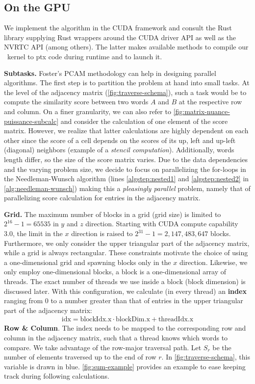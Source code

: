 \subsection{On the GPU}

We implement the algorithm in the CUDA framework and consult the  Rust library supplying Rust wrappers around the CUDA driver API as well as the NVRTC API (among others). The latter makes available methods to compile our \Cpp~kernel to \gls{ptx} code during runtime and to launch it.

\textbf{Subtasks.} Foster's PCAM methodology \cite{foster} can help in designing parallel algorithms. The first step is to partition the problem at hand into small tasks. At the level of the adjacency matrix (\autoref{fig:traverse-schema}), such a task would be to compute the similarity score between two words $A$ and $B$ at the respective row and column. On a finer granularity, we can also refer to \autoref{fig:matrix-nuance-puissance-subcalc} and consider the calculation of one element of the score matrix. However, we realize that latter calculations are highly dependent on each other since the score of a cell depends on the scores of its up, left and up-left (diagonal) neighbors (example of a \textit{stencil computation}). Additionally, words length differ, so the size of the score matrix varies. Due to the data dependencies and the varying problem size, we decide to focus on parallelizing the for-loops in the Needleman-Wunsch algorithm (lines \ref{algstep:nested1} and \ref{algstep:nested2} in \autoref{alg:needleman-wunsch}) making this a \textit{pleasingly parallel} problem, namely that of parallelizing score calculation for entries in the adjacency matrix.

\textbf{Grid.} The maximum number of blocks in a grid (grid size) is limited to $2^{16} - 1 = 65535$ in $y$ and $z$ direction. Starting with CUDA compute capability 3.0, the limit in the $x$ direction is raised to $2^{31} - 1 = 2,147,483,647$ blocks. Furthermore, we only consider the upper triangular part of the adjacency matrix, while a grid is always rectangular. These constraints motivate the choice of using a one-dimensional grid and spawning blocks only in the $x$ direction. Likewise, we only employ one-dimensional blocks, \ie a block is a one-dimensional array of threads. The exact number of threads we use inside a block (block dimension) is discussed later. With this configuration, we calculate (in every thread) an \textbf{index} ranging from $0$ to a number greater than that of entries in the upper triangular part of the adjacency matrix:
\begin{align}
    \text{idx} = \text{blockIdx.x} \cdot \text{blockDim.x} + \text{threadIdx.x}
    \label{eq:idx}
\end{align}
\textbf{Row \& Column}. The index  needs to be mapped to the corresponding row and column in the adjacency matrix, such that a thread knows which words to compare. We take advantage of the row-major traversal path. Let $S_r$ be the number of elements traversed up to the end of row $r$. In \autoref{fig:traverse-schema}, this variable is drawn in blue. \autoref{fig:sum-example} provides an example to ease keeping track during following calculations.

